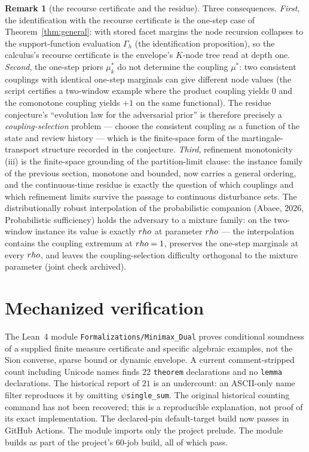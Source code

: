 \documentclass[10pt,twocolumn]{article}
\theoremstyle{definition}
\newtheorem{remark}{Remark}
\begin{document}
\begin{remark}[the recourse certificate and the residue]\label{rem:after-general}
Three consequences. \emph{First}, the identification with the recourse
certificate is the one-step case of Theorem~\ref{thm:general}: with
stored facet margins the node recursion collapses to the
support-function evaluation $\Gamma_{h}$ (the identification
proposition), so the calculus's recourse
certificate is the envelope's $K$-node tree read at depth one.
\emph{Second}, the one-step priors $\mu^{*}_{k}$ do not determine the
coupling $\mu^{*}$: two consistent couplings with identical one-step
marginals can give different node values (the script certifies a
two-window example where the product coupling yields $0$ and the
comonotone coupling yields $+1$ on the same functional). The residue
conjecture's ``evolution law for the adversarial prior'' is therefore
precisely a \emph{coupling-selection} problem --- choose the consistent
coupling as a function of the state and review history --- which is the finite-space form of the martingale-transport structure recorded in the conjecture. \emph{Third}, refinement monotonicity (iii) is the
finite-space grounding of the partition-limit clause: the instance
family of the previous section, monotone and bounded, now carries a
general ordering, and the continuous-time residue is exactly the
question of which couplings and which refinement limits survive the
passage to continuous disturbance sets. The distributionally robust
interpolation of the probabilistic companion (Abaee, 2026, Probabilistic sufficiency) holds the
adversary to a mixture family: on the two-window instance its value is
exactly $\\rho$ at parameter $\\rho$ --- the interpolation contains the
coupling extremum at $\\rho = 1$, preserves the one-step marginals at
every $\\rho$, and leaves the coupling-selection difficulty orthogonal to
the mixture parameter (joint check archived).
\end{remark}

\section{Mechanized verification}

The Lean~4 module \texttt{Formalizations/Minimax\_Dual} proves
conditional soundness of a supplied finite measure certificate and
specific algebraic examples, not the Sion converse, sparse bound or
dynamic envelope. A current comment-stripped count including Unicode names finds \(22\)
\texttt{theorem} declarations and no \texttt{lemma} declarations.
The historical report of \(21\) is an undercount: an ASCII-only name
filter reproduces it by omitting \texttt{\ensuremath{\psi}single\_sum}.
The original historical counting command has not been recovered; this
is a reproducible explanation, not proof of its exact implementation.
The declared-pin default-target build now passes in GitHub Actions. The module imports only the
project prelude. The module builds as part of the project's \(60\)-job build, all of
which pass.
\end{document}

